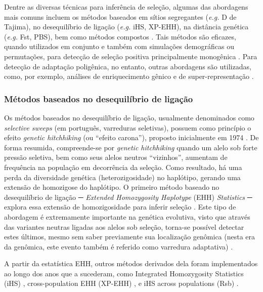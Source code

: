 Dentre as diversas técnicas para inferência de seleção, algumas das abordagens mais comuns incluem os métodos baseados em sítios segregantes (\emph{e.g.} D de Tajima), no desequilíbrio de ligação (\emph{e.g.} iHS, XP-EHH), na distância genética (\emph{e.g.} Fst, PBS), bem como métodos compostos \cite{vitti_detecting_2013}. Tais métodos são eficazes, quando utilizados em conjunto e também com simulações demográficas ou permutações, para detecção de seleção positiva principalmente monogênica \cite{nielsen_recent_2007}. Para detecção de adaptação poligênica, no entanto, outras abordagens são utilizadas, como, por exemplo, análises de enriquecimento gênico e de super-representação \cite{wang_web-based_2013,watanabe_functional_2017,liao_webgestalt_2019}.

\subsubsection{Métodos baseados no desequilíbrio de ligação}

Os métodos baseados no desequilíbrio de ligação, usualmente denominados como \textit{selective sweeps} (em português, varreduras seletivas), possuem como princípio o efeito \textit{genetic hitchhiking} (ou “efeito carona”), proposto inicialmente em 1974 \cite{smith_hitch-hiking_1974}. De forma resumida, compreende-se por \textit{genetic hitchhiking} quando um alelo sob forte pressão seletiva, bem como seus alelos neutros “vizinhos”, aumentam de frequência na população em decorrência da seleção. Como resultado, há uma perda da diversidade genética (heterozigosidade) no haplótipo, gerando uma extensão de homozigose do haplótipo. O primeiro método baseado no desequilíbrio de ligação ─ \textit{Extended Homozygosity Haplotype} (EHH) \textit{Statistics} ─ explora essa extensão de homozigosidade para inferir seleção \cite{sabeti_detecting_2002}. Este tipo de abordagem é extremamente importante na genética evolutiva, visto que através das variantes neutras ligadas aos alelos sob seleção, torna-se possível detectar estes últimos, mesmo sem saber previamente sua localização genômica (nesta era da genômica, este evento também é referido como varredura adaptativa) \cite{novembre_human_2012,stephan_selective_2019}.

A partir da estatística EHH, outros métodos derivados dela foram implementados ao longo dos anos que a sucederam, como Integrated Homozygosity Statistics (iHS) \cite{voight_map_2006}, cross-population EHH (XP-EHH) \cite{sabeti_genome-wide_2007}, e iHS across populations (Rsb) \cite{tang_new_2007}. 

